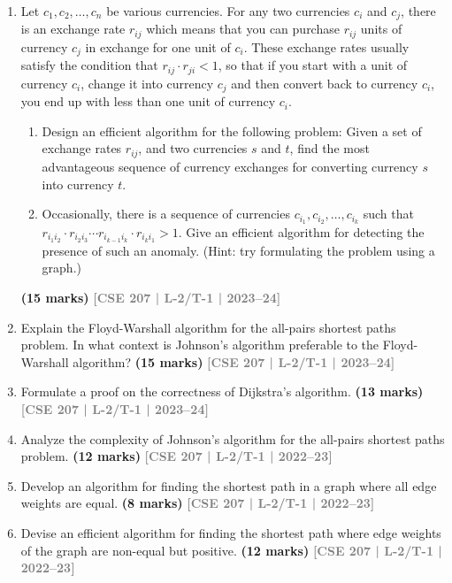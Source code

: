 \documentclass[12pt]{article}
\newcommand{\yr}[1]{\hfill\textcolor{gray}{\small\textbf{[#1]}}}
\newcommand{\mk}[1]{\textcolor{orange!70!black}{\small\textbf{(#1 marks)}}}
\begin{document}
\begin{enumerate}
\item Let $c_1, c_2, \dots, c_n$ be various currencies. For any two currencies $c_i$ and $c_j$, there is an 
exchange rate $r_{ij}$ which means that you can purchase $r_{ij}$ units of currency $c_j$ in 
exchange for one unit of $c_i$. These exchange rates usually satisfy the condition that 
$r_{ij} \cdot r_{ji} < 1$, so that if you start with a unit of currency $c_i$, change it into currency $c_j$ and 
then convert back to currency $c_i$, you end up with less than one unit of currency $c_i$.
\begin{enumerate}
  \item Design an efficient algorithm for the following problem: Given a set of exchange rates $r_{ij}$, and two currencies $s$ and $t$, find the most advantageous sequence of currency exchanges for converting currency $s$ into currency $t$.
  \item Occasionally, there is a sequence of currencies $c_{i_1}, c_{i_2}, \ldots, c_{i_k}$ such that $r_{i_1 i_2} \cdot r_{i_2 i_3} \cdots r_{i_{k-1} i_k} \cdot r_{i_k i_1} > 1$. Give an efficient algorithm for detecting the presence of such an anomaly. (Hint: try formulating the problem using a graph.)
\end{enumerate}
\mk{15} \yr{CSE 207 | L-2/T-1 | 2023--24}


\item Explain the Floyd-Warshall algorithm for the all-pairs shortest paths problem. In what context is Johnson's algorithm preferable to the Floyd-Warshall algorithm?
\mk{15} \yr{CSE 207 | L-2/T-1 | 2023--24}


\item Formulate a proof on the correctness of Dijkstra's algorithm.
\mk{13} \yr{CSE 207 | L-2/T-1 | 2023--24}


\item Analyze the complexity of Johnson's algorithm for the all-pairs shortest paths problem.
\mk{12} \yr{CSE 207 | L-2/T-1 | 2022--23}


\item Develop an algorithm for finding the shortest path in a graph where all edge weights are equal.
\mk{8} \yr{CSE 207 | L-2/T-1 | 2022--23}


\item Devise an efficient algorithm for finding the shortest path where edge weights of the graph are non-equal but positive.
\mk{12} \yr{CSE 207 | L-2/T-1 | 2022--23}



\end{enumerate}
\end{document}
